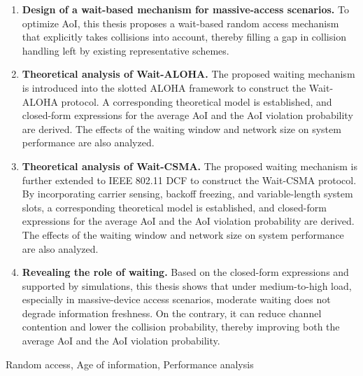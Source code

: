 \begin{abstractEN}
\begin{enumerate} [wide]
\item \textbf{Design of a wait-based mechanism for massive-access scenarios.} To optimize AoI, this thesis proposes a wait-based random access mechanism that explicitly takes collisions into account, thereby filling a gap in collision handling left by existing representative schemes.

\item \textbf{Theoretical analysis of Wait-ALOHA.} The proposed waiting mechanism is introduced into the slotted ALOHA framework to construct the Wait-ALOHA protocol. A corresponding theoretical model is established, and closed-form expressions for the average AoI and the AoI violation probability are derived. The effects of the waiting window and network size on system performance are also analyzed.

\item \textbf{Theoretical analysis of Wait-CSMA.} The proposed waiting mechanism is further extended to IEEE 802.11 DCF to construct the Wait-CSMA protocol. By incorporating carrier sensing, backoff freezing, and variable-length system slots, a corresponding theoretical model is established, and closed-form expressions for the average AoI and the AoI violation probability are derived. The effects of the waiting window and network size on system performance are also analyzed.

\item \textbf{Revealing the role of waiting.} Based on the closed-form expressions and supported by simulations, this thesis shows that under medium-to-high load, especially in massive-device access scenarios, moderate waiting does not degrade information freshness. On the contrary, it can reduce channel contention and lower the collision probability, thereby improving both the average AoI and the AoI violation probability.
\end{enumerate}

\end{abstractEN}

\begin{keywordEN}
Random access, Age of information, Performance analysis
\end{keywordEN}
